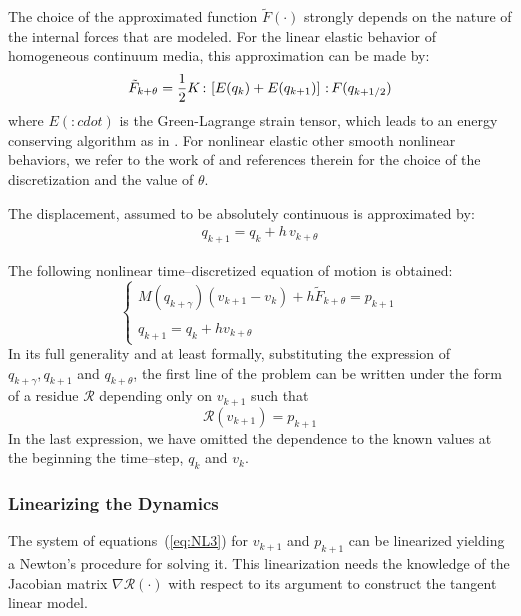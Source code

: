 \begin{remark} \label{eq:Simo}
  The choice of the approximated function $\tilde F(\cdot)$ strongly depends
  on the nature of the internal forces that are modeled. For the
  linear elastic behavior of homogeneous continuum media, this
  approximation can be made by:
\begin{equation}
\tilde F_{k+\theta} = \frac 1 2 K{\,:\,}\left[E(q_{k})+E(q_{k+1})\right] {\,:\,} F(q_{k+1/2})
\end{equation}
where $E(:cdot)$ is the Green-Lagrange strain tensor, which leads to an energy conserving algorithm as in
\citep{Simo.Tarnow92}. For nonlinear elastic other smooth nonlinear
behaviors, we refer to the work of
\citep{Gonzalez2000,Laursen.Meng2001} and references therein for the choice of the
discretization and the value of $\theta$.
\end{remark}

The displacement, assumed to be absolutely continuous is approximated by:
\begin{eqnarray}
&  q_{k+1} = q_{k} +  h\,v_{k+\theta}  & \nonumber
\end{eqnarray}


The following nonlinear time--discretized equation of motion is obtained:
\begin{equation}
\label{eq:NSCD-discret-nl}
\begin{cases}
    M(q_{k+\gamma}) (v_{k+1}-v_{k}) + h \tilde F_{k+\theta} = p_{k+1} \\  \\
    q_{k+1} = q_{k} +  h v_{k+\theta}
\end{cases}
\end{equation}
In its full generality and at least formally, substituting the expression of $q_{k+\gamma},q_{k+1}$ and $q_{k+\theta}$,  the first line of the  problem can be written under the form of a residue $\mathcal R$ depending only on $v_{k+1}$ such that
\begin{equation}
  \label{eq:NL3}
  \mathcal R (v_{k+1}) = p_{k+1}
\end{equation}
In the last expression, we have omitted the dependence to the known values at the beginning the time--step, \ie{} $q_k$ and $v_k$.

\subsubsection{Linearizing the Dynamics}

The system of equations~(\ref{eq:NL3}) for $v_{k+1}$ and $p_{k+1}$ can be linearized yielding a Newton's procedure  for solving it. This linearization needs the knowledge of the Jacobian matrix  $\nabla \mathcal R (\cdot)$ with respect to its argument to construct the tangent linear model.

